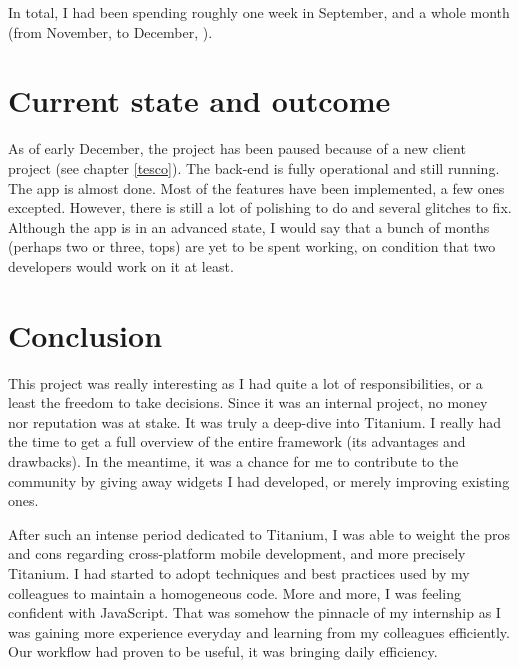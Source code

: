 In total, I had been spending roughly one week in September, and a whole month (from November,  to December, ).

\section{Current state and outcome}

As of early December, the project has been paused because of a new client project (see chapter \ref{tesco}). The back-end is fully operational and still running. The app is almost done. Most of the features have been implemented, a few ones excepted. However, there is still a lot of polishing to do and several glitches to fix. Although the app is in an advanced state, I would say that a bunch of months (perhaps two or three, tops) are yet to be spent working, on condition that two developers would work on it at least.

\section{Conclusion}

This project was really interesting as I had quite a lot of responsibilities, or a least the freedom to take decisions. Since it was an internal project, no money nor reputation was at stake. It was truly a deep-dive into Titanium. I really had the time to get a full overview of the entire framework (its advantages and drawbacks). In the meantime, it was a chance for me to contribute to the community by giving away widgets I had developed, or merely improving existing ones.

\medskip

After such an intense period dedicated to Titanium, I was able to weight the pros and cons regarding cross-platform mobile development, and more precisely Titanium. I had started to adopt techniques and best practices used by my colleagues to maintain a homogeneous code. More and more, I was feeling confident with JavaScript. That was somehow the pinnacle of my internship as I was gaining more experience everyday and learning from my colleagues efficiently. Our workflow had proven to be useful, it was bringing daily efficiency.